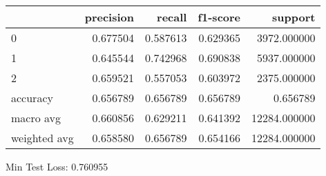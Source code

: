 \begin{tabular}{lrrrr}
\toprule
{} &  precision &    recall &  f1-score &       support \\
\midrule
0            &   0.677504 &  0.587613 &  0.629365 &   3972.000000 \\
1            &   0.645544 &  0.742968 &  0.690838 &   5937.000000 \\
2            &   0.659521 &  0.557053 &  0.603972 &   2375.000000 \\
accuracy     &   0.656789 &  0.656789 &  0.656789 &      0.656789 \\
macro avg    &   0.660856 &  0.629211 &  0.641392 &  12284.000000 \\
weighted avg &   0.658580 &  0.656789 &  0.654166 &  12284.000000 \\
\bottomrule
\end{tabular}

Min Test Loss: 0.760955